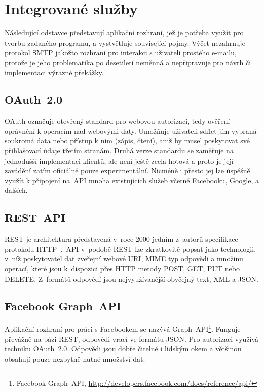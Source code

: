 \documentclass[12pt,oneside,final]{fithesis2}
\begin{document}
\section{Integrované služby}
Následující odstavce představují aplikační rozhraní, jež je potřeba využít pro tvorbu zadaného programu, a vystvětluje související pojmy. Výčet nezahrnuje protokol SMTP jakožto rozhraní pro interakci s uživateli prostého e-mailu, protože je jeho problematika po desetiletí neměnná a nepřipravuje pro návrh či implementaci výrazné překážky.

\subsection{OAuth~2.0}
OAuth označuje otevřený standard pro webovou autorizaci, tedy ověření oprávnění k operacím nad webovými daty. Umožňuje uživateli sdílet jím vybraná soukromá data nebo přístup k nim (zápis, čtení), aniž by musel poskytovat své přihlašovací údaje třetím stranám. Druhá verze standardu se zaměřuje na jednodušší implementaci klientů, ale není ještě zcela hotová a proto je její zavádění zatím oficiálně pouze experimentální. Nicméně i přesto jej lze úspěšně využít k připojení na~API mnoha existujících služeb včetně Facebooku, Google, a dalších.

\subsection{REST~API}
REST je architektura představená v~roce 2000 jedním z~autorů specifikace protokolu HTTP~\cite{fielding2000architectural}.~API v~podobě REST lze zkratkovitě popsat jako technologii, v~níž poskytovatel dat zveřejní webové URI, MIME typ odpovědi a množinu operací, které jsou k~dispozici přes HTTP metody POST, GET, PUT nebo DELETE. Z~formátů odpovědí jsou nej\-využívanější obyčejný text, XML a JSON.

\subsection{Facebook Graph~API}
Aplikační rozhraní pro práci s Facebookem se nazývá Graph~API\footnote{Facebook Graph~API, \url{http://developers.facebook.com/docs/reference/api/}}. Funguje převážně na bázi REST, odpovědi vrací ve formátu JSON. Pro autorizaci využívá techniku OAuth~2.0. Odpovědi jsou dobře čitelné i lidským okem a většinou obsahují pouze nezbytně nutné množství dat.
\end{document}
